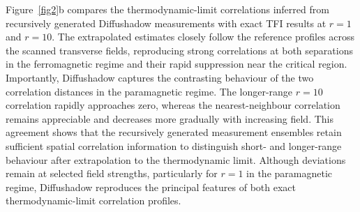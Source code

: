 \documentclass[pdflatex,sn-nature]{sn-jnl}%
\theoremstyle{thmstyleone}%
\theoremstyle{thmstyletwo}%
\theoremstyle{thmstylethree}%
\begin{document}
Figure~\ref{fig2}b compares the thermodynamic-limit correlations inferred from recursively generated Diffushadow measurements with exact TFI results at $r=1$ and $r=10$. The extrapolated estimates closely follow the reference profiles across the scanned transverse fields, reproducing strong correlations at both separations in the ferromagnetic regime and their rapid suppression near the critical region. Importantly, Diffushadow captures the contrasting behaviour of the two correlation distances in the paramagnetic regime. The longer-range $r=10$ correlation rapidly approaches zero, whereas the nearest-neighbour correlation remains appreciable and decreases more gradually with increasing field. This agreement shows that the recursively generated measurement ensembles retain sufficient spatial correlation information to distinguish short- and longer-range behaviour after extrapolation to the thermodynamic limit. Although deviations remain at selected field strengths, particularly for $r=1$ in the paramagnetic regime, Diffushadow reproduces the principal features of both exact thermodynamic-limit correlation profiles.




\end{document}
